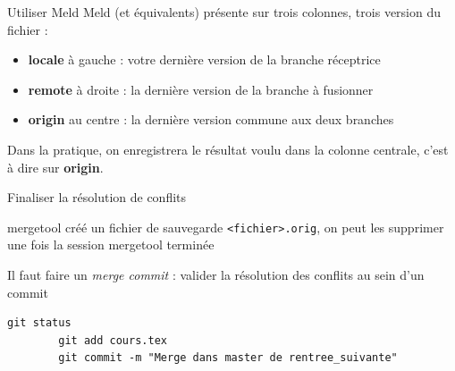 \documentclass{beamer}
\begin{document}
\begin{frame}{Utiliser Meld}
	Meld (et équivalents) présente sur trois colonnes, trois version du fichier :
	\begin{itemize}
		\item \textbf{locale} à gauche : votre dernière version de la branche réceptrice
		\item \textbf{remote} à droite : la dernière version de la branche à fusionner
		\item \textbf{origin} au centre : la dernière version commune aux deux branches
	\end{itemize}
	
	Dans la pratique, on enregistrera le résultat voulu dans la colonne centrale, c'est à dire sur \textbf{origin}.
\end{frame}

\begin{frame}[fragile]{Finaliser la résolution de conflits}

	mergetool créé un fichier de sauvegarde \texttt{<fichier>.orig}, on peut les supprimer une fois la session mergetool terminée
	\vfill{}
	
	Il faut faire un \textit{merge commit} : valider la résolution des conflits au sein d'un commit
	\begin{lstlisting}[frame=single]
		git status
		git add cours.tex
		git commit -m "Merge dans master de rentree_suivante"
	\end{lstlisting}	
\end{frame}
\end{document}
